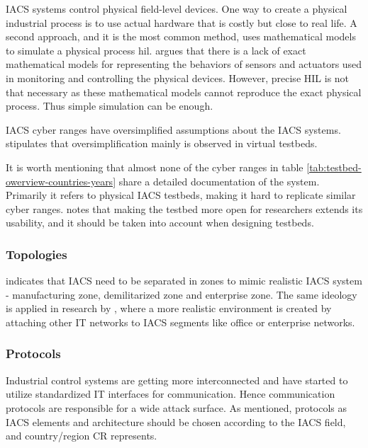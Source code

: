 IACS systems control physical field-level devices. One way to create a physical industrial process is to use actual hardware that is costly but close to real life. A second approach, and it is the most common method, uses mathematical models to simulate a physical process \gls*{hil}. \citeauthor{35-ten-lessons-ics-testbeds} \parencite{35-ten-lessons-ics-testbeds} argues that there is a lack of exact mathematical models for representing the behaviors of sensors and actuators used in monitoring and controlling the physical devices. However, precise HIL is not that necessary as these mathematical models cannot reproduce the exact physical process. Thus simple simulation can be enough.

IACS cyber ranges have oversimplified assumptions about the IACS systems. \citeauthor{35-ten-lessons-ics-testbeds} \parencite{35-ten-lessons-ics-testbeds} stipulates that oversimplification mainly is observed in virtual testbeds.

It is worth mentioning that almost none of the cyber ranges in table \ref{tab:testbed-owerview-countries-years} share a detailed documentation of the system. Primarily it refers to physical IACS testbeds, making it hard to replicate similar cyber ranges. \citeauthor{35-ten-lessons-ics-testbeds} \parencite{35-ten-lessons-ics-testbeds} notes that making the testbed more open for researchers extends its usability, and it should be taken into account when designing testbeds.

\subsubsection{Topologies} \label{ss:topologies}

\citeauthor{35-ten-lessons-ics-testbeds} \parencite{35-ten-lessons-ics-testbeds} indicates that IACS need to be separated in zones to mimic realistic IACS system - manufacturing zone, demilitarized zone and enterprise zone. The same ideology is applied in research by \citeauthor{32-springer-scada-testbed-research-training} \parencite{32-springer-scada-testbed-research-training}, where a more realistic environment is created by attaching other IT networks to IACS segments like office or enterprise networks.


\subsubsection{Protocols}

Industrial control systems are getting more interconnected and have started to utilize standardized IT interfaces for communication. Hence communication protocols are responsible for a wide attack surface. As \citeauthor{35-ten-lessons-ics-testbeds} \parencite{35-ten-lessons-ics-testbeds} mentioned, 
protocols as IACS elements and architecture should be chosen according to the IACS field, and country/region CR represents. 

